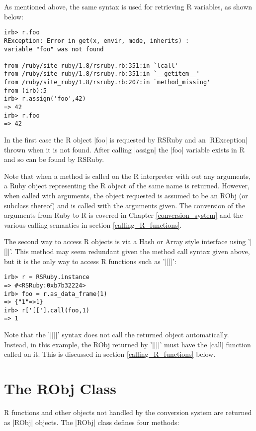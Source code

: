 \documentclass[a4paper,12pt]{book}
\begin{document}
As mentioned above, the same syntax is used for retrieving R variables, as shown below:

\begin{Verbatim}
irb> r.foo
RException: Error in get(x, envir, mode, inherits) :
variable "foo" was not found

from /ruby/site_ruby/1.8/rsruby.rb:351:in `lcall'
from /ruby/site_ruby/1.8/rsruby.rb:351:in `__getitem__'
from /ruby/site_ruby/1.8/rsruby.rb:207:in `method_missing'
from (irb):5
irb> r.assign('foo',42)
=> 42
irb> r.foo
=> 42
\end{Verbatim}

In the first case the R object |foo| is requested by RSRuby and an |RException| thrown when it is not found. After calling |assign| the |foo| variable exists in R and so can be found by RSRuby.

Note that when a method is called on the R interpreter with out any arguments, a Ruby object representing the R object of the same name is returned. However, when called with arguments, the object requested is assumed to be an RObj (or subclass thereof) and is called with the arguments given. The conversion of the arguments from Ruby to R is covered in Chapter \ref{conversion_system} and the various calling semantics in section \ref{calling_R_functions}.

The second way to access R objects is via a Hash or Array style interface using '|[]|'. This method may seem redundant given the method call syntax given above, but it is the only way to access R functions such as '|[[|':

\begin{Verbatim}
irb> r = RSRuby.instance
=> #<RSRuby:0xb7b32224>
irb> foo = r.as_data_frame(1)
=> {"1"=>1}
irb> r['[['].call(foo,1)
=> 1
\end{Verbatim}

Note that the '|[]|' syntax does not call the returned object automatically. Instead, in this example, the RObj returned by '|[]|' must have the |call| function called on it. This is discussed in section \ref{calling_R_functions} below.

\section{The RObj Class}\label{the_robj_class}

R functions and other objects not handled by the conversion system are returned as |RObj| objects. The |RObj| class defines four methods:
\end{document}
